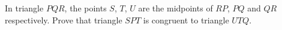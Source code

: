 In triangle $PQR$, the points $S$, $T$, $U$ are the midpoints of $RP$, $PQ$ and $QR$ respectively. Prove that triangle $SPT$ is congruent to triangle $UTQ$.
